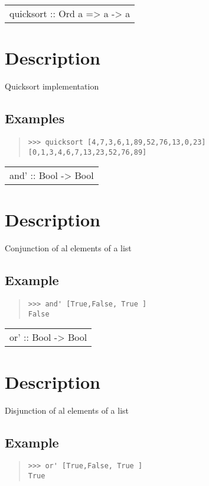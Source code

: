 \begin{haddockdesc}
\item[\begin{tabular}{@{}l}
quicksort :: Ord a => {\char 91}a{\char 93} -> {\char 91}a{\char 93}
\end{tabular}]
{\haddockbegindoc
\section*{Description}
Quicksort implementation\par
\subsection*{Examples}
\begin{quote}
{\haddockverb\begin{verbatim}
>>> quicksort [4,7,3,6,1,89,52,76,13,0,23]
[0,1,3,4,6,7,13,23,52,76,89]

\end{verbatim}}
\end{quote}}
\end{haddockdesc}
\begin{haddockdesc}
\item[\begin{tabular}{@{}l}
and' :: {\char 91}Bool{\char 93} -> Bool
\end{tabular}]
{\haddockbegindoc
\section*{Description}
Conjunction of al elements of a list\par
\subsection*{Example}
\begin{quote}
{\haddockverb\begin{verbatim}
>>> and' [True,False, True ]
False

\end{verbatim}}
\end{quote}}
\end{haddockdesc}
\begin{haddockdesc}
\item[\begin{tabular}{@{}l}
or' :: {\char 91}Bool{\char 93} -> Bool
\end{tabular}]
{\haddockbegindoc
\section*{Description}
Disjunction of al elements of a list\par
\subsection*{Example}
\begin{quote}
{\haddockverb\begin{verbatim}
>>> or' [True,False, True ]
True

\end{verbatim}}
\end{quote}}
\end{haddockdesc}

